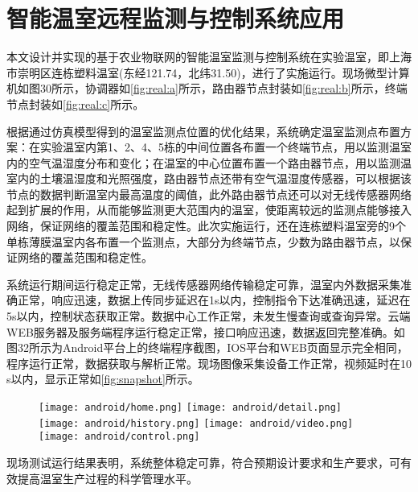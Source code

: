\section{智能温室远程监测与控制系统应用}
本文设计并实现的基于农业物联网的智能温室监测与控制系统在实验温室，即上海市崇明区连栋塑料温室(东经121.74，北纬31.50)，进行了实施运行。现场微型计算机如图30所示，协调器如\ref{fig:real:a}所示，路由器节点封装如\ref{fig:real:b}所示，终端节点封装如\ref{fig:real:c}所示。
\begin{figure}[!htbp]
	\centering
\end{figure}
根据通过仿真模型得到的温室监测点位置的优化结果，系统确定温室监测点布置方案：在实验温室内第1、2、4、5栋的中间位置各布置一个终端节点，用以监测温室内的空气温湿度分布和变化；在温室的中心位置布置一个路由器节点，用以监测温室内的土壤温湿度和光照强度，路由器节点还带有空气温湿度传感器，可以根据该节点的数据判断温室内最高温度的阈值，此外路由器节点还可以对无线传感器网络起到扩展的作用，从而能够监测更大范围内的温室，使距离较远的监测点能够接入网络，保证网络的覆盖范围和稳定性。此次实施运行，还在连栋塑料温室旁的9个单栋薄膜温室内各布置一个监测点，大部分为终端节点，少数为路由器节点，以保证网络的覆盖范围和稳定性。

系统运行期间运行稳定正常，无线传感器网络传输稳定可靠，温室内外数据采集准确正常，响应迅速，数据上传同步延迟在1s以内，控制指令下达准确迅速，延迟在5s以内，控制状态获取正常。数据中心工作正常，未发生慢查询或查询异常。云端WEB服务器及服务端程序运行稳定正常，接口响应迅速，数据返回完整准确。如图32所示为Android平台上的终端程序截图，IOS平台和WEB页面显示完全相同，程序运行正常，数据获取与解析正常。现场图像采集设备工作正常，视频延时在10 s以内，显示正常如\ref{fig:snapshot}所示。
	\begin{figure}[!htbp]
		\centering
		\texttt{[image: android/home.png]}
		\texttt{[image: android/detail.png]}
		\texttt{[image: android/history.png]}
		\texttt{[image: android/video.png]}
		\texttt{[image: android/control.png]}	
	\end{figure}
现场测试运行结果表明，系统整体稳定可靠，符合预期设计要求和生产要求，可有效提高温室生产过程的科学管理水平。

